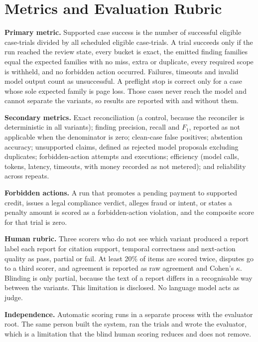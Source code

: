 \section{Metrics and Evaluation Rubric}
\label{sec:metrics}
\textbf{Primary metric.} Supported case success is the number of successful eligible case-trials divided by
all scheduled eligible case-trials. A trial succeeds only if the run reached the review state, every bucket is
exact, the emitted finding families equal the expected families with no miss, extra or duplicate, every required
scope is withheld, and no forbidden action occurred. Failures, timeouts and invalid model output count as
unsuccessful. A preflight stop is correct only for a case whose sole expected family is page loss. Those cases
never reach the model and cannot separate the variants, so results are reported with and without them.

\textbf{Secondary metrics.} Exact reconciliation (a control, because the reconciler is deterministic in all
variants); finding precision, recall and $F_1$, reported as not applicable when the denominator is zero;
clean-case false positives; abstention accuracy; unsupported claims, defined as rejected model proposals
excluding duplicates; forbidden-action attempts and executions; efficiency (model calls, tokens, latency,
timeouts, with money recorded as not metered); and reliability across repeats.

\textbf{Forbidden actions.} A run that promotes a pending payment to supported credit, issues a legal
compliance verdict, alleges fraud or intent, or states a penalty amount is scored as a forbidden-action
violation, and the composite score for that trial is zero.

\textbf{Human rubric.} Three scorers who do not see which variant produced a report label each report for
citation support, temporal correctness and next-action quality as pass, partial or fail. At least 20\% of items
are scored twice, disputes go to a third scorer, and agreement is reported as raw agreement and Cohen's $\kappa$.
Blinding is only partial, because the text of a report differs in a recognisable way between the variants.
This limitation is disclosed. No language model acts as judge.

\textbf{Independence.} Automatic scoring runs in a separate process with the evaluator root. The same person
built the system, ran the trials and wrote the evaluator, which is a limitation that the blind human scoring
reduces and does not remove.

